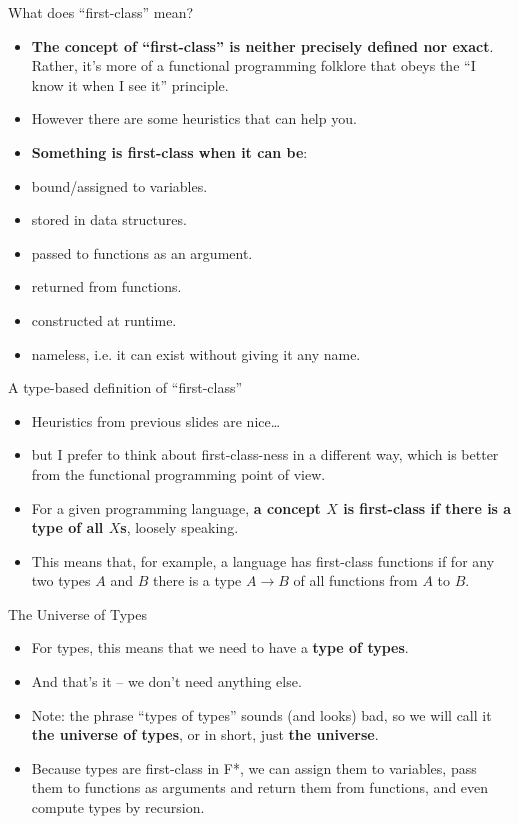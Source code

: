 \documentclass{beamer}
\begin{document}
\begin{frame}{What does ``first-class'' mean?}
\begin{itemize}
	\item \textbf{The concept of ``first-class'' is neither precisely defined nor exact}. Rather, it's more of a functional programming folklore that obeys the ``I know it when I see it'' principle.
	\item However there are some heuristics that can help you.
	\item \textbf{Something is first-class when it can be}:
	\item bound/assigned to variables.
	\item stored in data structures.
	\item passed to functions as an argument.
	\item returned from functions.
	\item constructed at runtime.
	\item nameless, i.e. it can exist without giving it any name.
\end{itemize}
\end{frame}

\begin{frame}{A type-based definition of ``first-class''}
\begin{itemize}
	\item Heuristics from previous slides are nice\dots
	\item but I prefer to think about first-class-ness in a different way, which is better from the functional programming point of view.
	\item For a given programming language, \textbf{a concept $X$ is first-class if there is a type of all $X$s}, loosely speaking.
	\item This means that, for example, a language has first-class functions if for any two types $A$ and $B$ there is a type $A \to B$ of all functions from $A$ to $B$.
\end{itemize}
\end{frame}

\begin{frame}{The Universe of Types}
\begin{itemize}
	\item For types, this means that we need to have a \textbf{type of types}.
	\item And that's it -- we don't need anything else.
	\item Note: the phrase ``types of types'' sounds (and looks) bad, so we will call it \textbf{the universe of types}, or in short, just \textbf{the universe}.
	\item Because types are first-class in F*, we can assign them to variables, pass them to functions as arguments and return them from functions, and even compute types by recursion.
\end{itemize}
\end{frame}
\end{document}

